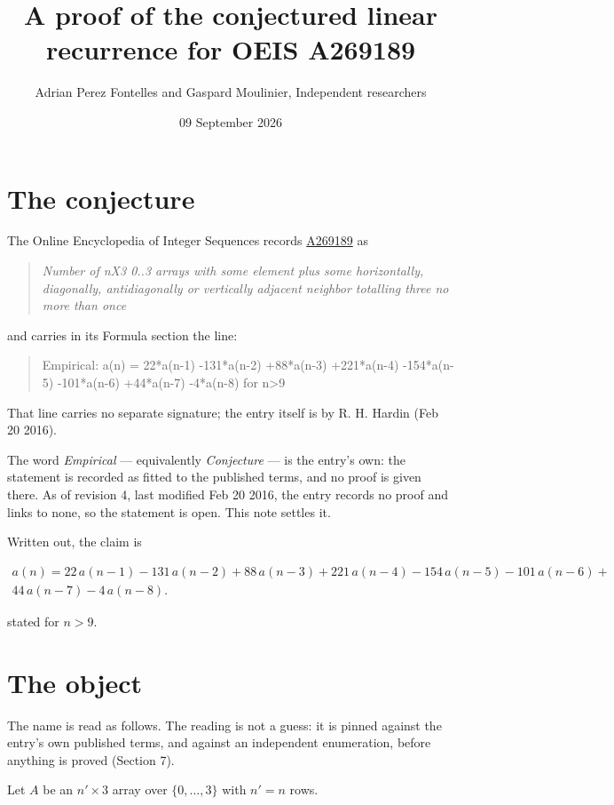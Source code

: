 \documentclass[11pt]{article}
\title{A proof of the conjectured linear recurrence for OEIS A269189}
\author{Adrian Perez Fontelles and Gaspard Moulinier, Independent researchers}
\date{09 September 2026}
\theoremstyle{definition}
\begin{document}
\maketitle
\section{The conjecture}

The Online Encyclopedia of Integer Sequences records \href{https://oeis.org/A269189}{A269189} as

\begin{quote}\itshape Number of nX3 0..3 arrays with some element plus some horizontally, diagonally, antidiagonally or vertically adjacent neighbor totalling three no more than once\end{quote}

and carries in its Formula section the line:

\begin{quote}\ttfamily Empirical: a(n) = 22*a(n-1) -131*a(n-2) +88*a(n-3) +221*a(n-4) -154*a(n-5) -101*a(n-6) +44*a(n-7) -4*a(n-8) for n>9\end{quote}

That line carries no separate signature; the entry itself is by R. H. Hardin (Feb 20 2016).

The word {\itshape Empirical} --- equivalently {\itshape Conjecture} --- is the entry's own: the statement is recorded as fitted to the published terms, and no proof is given there. As of revision 4, last modified Feb 20 2016, the entry records no proof and links to none, so the statement is open. This note settles it.

Written out, the claim is

\begin{multline*} a(n) = 22\,a(n-1) - 131\,a(n-2) + 88\,a(n-3) + 221\,a(n-4) - 154\,a(n-5) - 101\,a(n-6) + \\ 44\,a(n-7) - 4\,a(n-8). \end{multline*}

stated for $n > 9$.

\section{The object}

The name is read as follows. The reading is not a guess: it is pinned against the entry's own published terms, and against an independent enumeration, before anything is proved (Section 7).

Let $A$ be an $n' \times 3$ array over $\{0,\dots,3\}$ with $n' = n$ rows.
\end{document}
